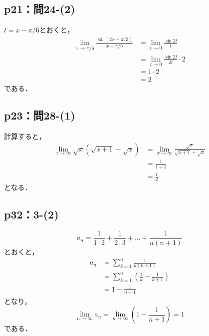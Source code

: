 \documentclass[uplatex,dvipdfmx,a4paper,10pt,fleqn]{jsarticle}
\newenvironment{tleftbar}{\begin{tbleftline}\setlength{\parindent}{1zw}}{\end{tbleftline}}
\begin{document}
\subsection*{p21：問24-(2)}

\begin{tleftbar}
    $t = x - \pi/6$とおくと，
    \begin{align*} 
        \lim_{x \to \pi/6} \frac{\sin (2x-\pi/3)}{x - \pi/6} & = \lim_{t \to 0} \frac{\sin 2 t}{t} \\
        & = \lim_{t \to 0} \frac{\sin 2t}{2t} \cdot 2 \\
        & = 1 \cdot 2 \\
        & = 2 
    \end{align*} 
    である．
\end{tleftbar}




\subsection*{p23：問28-(1)}

\begin{tleftbar}
    計算すると，
    \begin{align*} 
        \lim_{x \to \infty} \sqrt{x}(\sqrt{x+1}-\sqrt{x}) & = \lim_{x \to \infty} \frac{\sqrt{x}}{\sqrt{x+1}+\sqrt{x}} \\
        & = \frac{1}{1+1} \\
        & = \frac{1}{2}
    \end{align*}
    となる．
\end{tleftbar}


\subsection*{p32：3-(2)}

\begin{tleftbar}
    \[
        a_n = \frac{1}{1 \cdot 2}+\frac{1}{2 \cdot 3} + \dots + \frac{1}{n(n+1)}
    \]
    とおくと，
    \begin{align*} 
       a_n & =  \sum_{k=1}^{n} \frac{1}{k(k+1)} \\
       & = \sum_{k=1}^{n} \left ( \frac{1}{k} - \frac{1}{k+1} \right ) \\
       & = 1-\frac{1}{n+1}
    \end{align*} 
    となり，
    \[
        \lim_{n \to \infty} a_n = \lim_{n \to \infty} \left ( 1-\frac{1}{n+1} \right) =1
    \]
    である．
\end{tleftbar}
\end{document}
